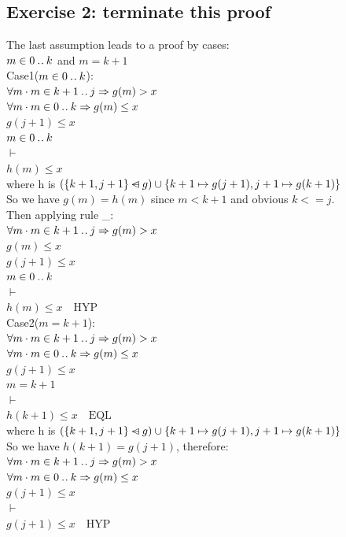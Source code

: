 \documentclass[11pt,a4paper,fleqn]{article}
\begin{document}
\subsection{Exercise 2: terminate this proof}
\noindent
The last assumption leads to a proof by cases:\\
$m \in 0 \mathbin{.\mkern1mu.} k$ and $m = k+1$\\

\noindent
Case1($m \in 0 \mathbin{.\mkern1mu.} k $):\\
$\forall m \cdot m \in k+1 \mathbin{.\mkern1mu.} j \Rightarrow g(m) > x  $\\
$\forall m \cdot m \in 0 \mathbin{.\mkern1mu.} k \Rightarrow g(m) \leq x $\\
$g(j+1) \leq x $\\
$m \in 0 \mathbin{.\mkern1mu.} k $\\
$ \vdash$ \\
$h(m) \leq x $\\
\noindent
where h is $ (\{k+1, j+1\} \mathbin{\lhd\mkern-14mu-} g) \cup\{k+1 \mapsto g(j+1), j+1 \mapsto g(k+1)\}$\\
So we have $g(m)=h(m) $ since $ m<k+1$ and obvious $ k<=j $.\\
Then applying rule \_:\\
$\forall m \cdot m \in k+1 \mathbin{.\mkern1mu.} j \Rightarrow g(m) > x  $\\
$ g(m) \leq x $\\
$g(j+1) \leq x $\\
$m \in 0 \mathbin{.\mkern1mu.} k $\\
$ \vdash$ \\
$h(m) \leq x \quad \text{HYP}$\\

\noindent
Case2($m=k+1$):\\
$\forall m \cdot m \in k+1 \mathbin{.\mkern1mu.} j \Rightarrow g(m) > x  $\\
$\forall m \cdot m \in 0 \mathbin{.\mkern1mu.} k \Rightarrow g(m) \leq x $\\
$g(j+1) \leq x $\\
$m = k +1 $\\
$ \vdash$\\
$h(k+1) \leq x\quad \text{EQL} $\\

\noindent
where h is $ (\{k+1, j+1\} \mathbin{\lhd\mkern-14mu-} g) \cup\{k+1 \mapsto g(j+1), j+1 \mapsto g(k+1)\}$\\
So we have $ h(k+1) = g(j+1)$, therefore:\\
$\forall m \cdot m \in k+1 \mathbin{.\mkern1mu.} j \Rightarrow g(m) > x  $\\
$\forall m \cdot m \in 0 \mathbin{.\mkern1mu.} k \Rightarrow g(m) \leq x $\\
$g(j+1) \leq x $\\
$ \vdash$\\
$g(j+1) \leq x \quad \text{HYP}$\\
\end{document}
